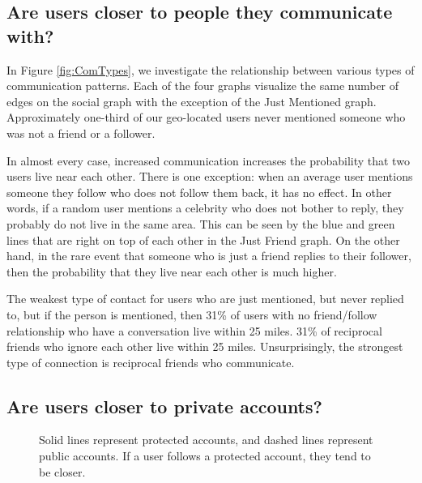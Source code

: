 \documentclass{sig-alternate}
\begin{document}
\subsection{Are users closer to people they communicate with?}
\begin{figure*}
\centering
{}
\caption{
CDF of the distance between a geo-located user and various types of contacts piloted on a logarithmic scale.
In these graphs, "I" refers to the geo-located user. "You" refers to their contact. 
}
\label{fig:ComTypes}
\end{figure*}
In Figure \ref{fig:ComTypes}, we investigate the relationship between various 
types of communication patterns.
Each of the four graphs visualize the same number of edges on the social graph with the exception of the Just Mentioned graph. Approximately one-third of our geo-located users never mentioned someone who was not a friend or a follower.

In almost every case, increased communication increases the probability that two users live near each other. There is one exception: when an average user mentions someone they follow who does not follow them back, it has no effect.
In other words, if a random user mentions a celebrity who does not bother to reply, they probably do not live in the same area. This can be seen by the blue and green lines that are right on top of each other in the Just Friend graph.
On the other hand, in the rare event that someone who is just a friend replies
to their follower, then the probability that they live near each other is much higher.

The weakest type of contact for users who are just mentioned, but never replied to, but if the person is mentioned, then 31\% of users with no friend/follow relationship who have a conversation live within 25 miles.
31\% of reciprocal friends who ignore each other live within 25 miles.
Unsurprisingly, the strongest type of connection is reciprocal friends who communicate.

\subsection{Are users closer to private accounts?}
\begin{figure}
\centering
{}
\caption{Solid lines represent protected accounts, and dashed lines represent public accounts. If a user follows a protected account, they tend to be closer.}
\label{fig:EdgeTypesProt}
\end{figure}
\end{document}
